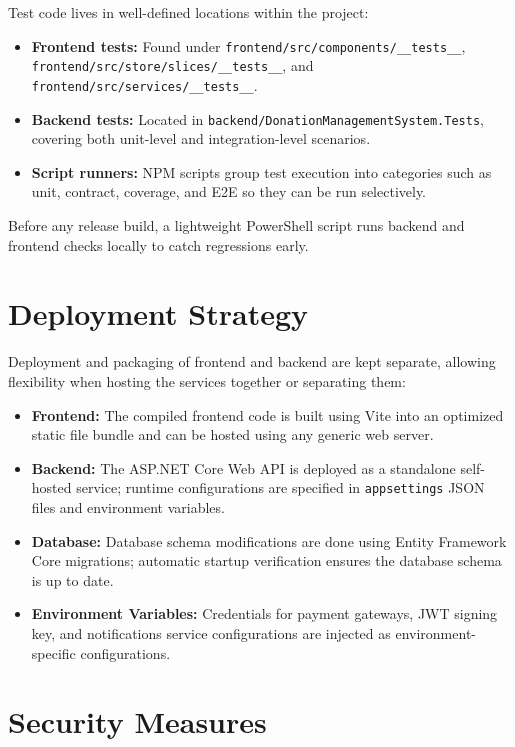\documentclass{thesis-library}
\begin{document}
Test code lives in well-defined locations within the project:
\begin{itemize}
    \item \textbf{Frontend tests:} Found under
          \texttt{frontend/src/\allowbreak{}components/\allowbreak{}\_\_tests\_\_},
          \texttt{frontend/src/\allowbreak{}store/\allowbreak{}slices/\allowbreak{}\_\_tests\_\_},
          and \texttt{frontend/src/\allowbreak{}services/\allowbreak{}\_\_tests\_\_}.
    \item \textbf{Backend tests:} Located in
          \texttt{backend/\allowbreak{}DonationManagementSystem.\allowbreak{}Tests},
          covering both unit-level and integration-level scenarios.
    \item \textbf{Script runners:} NPM scripts group test execution into categories such as unit, contract, coverage, and E2E so they can be run selectively.
\end{itemize}

Before any release build, a lightweight PowerShell script runs backend and frontend checks locally to catch regressions early.

\section{Deployment Strategy}

Deployment and packaging of frontend and backend are kept separate, allowing flexibility when hosting the services together or separating them:
\begin{itemize}
    \item \textbf{Frontend:} The compiled frontend code is built using Vite into an optimized static file bundle and can be hosted using any generic web server.
    \item \textbf{Backend:} The ASP.NET Core Web API is deployed as a standalone self-hosted service; runtime configurations are specified in \texttt{appsettings} JSON files and environment variables.
    \item \textbf{Database:} Database schema modifications are done using Entity Framework Core migrations; automatic startup verification ensures the database schema is up to date.
    \item \textbf{Environment Variables:} Credentials for payment gateways, JWT signing key, and notifications service configurations are injected as environment-specific configurations.
\end{itemize}

\section{Security Measures}
\end{document}
